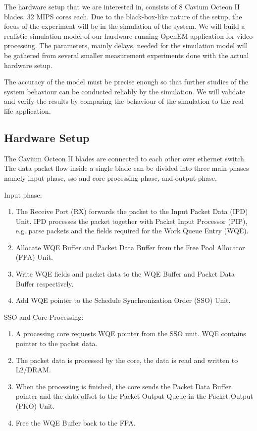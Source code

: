 The hardware setup that we are interested in, consists of 8 Cavium Octeon II blades, 32 MIPS cores each. Due to the black-box-like nature of the setup, the focus of the experiment will be in the simulation of the system. We will build a realistic simulation model of our hardware running OpenEM application for video processing. The parameters, mainly delays, needed for the simulation model will be gathered from several smaller measurement experiments done with the actual hardware setup.

The accuracy of the model must be precise enough so that further studies of the system behaviour can be conducted reliably by the simulation. We will validate and verify the results by comparing the behaviour of the simulation to the real life application.

\subsection{Hardware Setup}
The Cavium Octeon II blades are connected to each other over ethernet switch. The data packet flow inside a single blade can be divided into three main phases namely input phase, sso and core processing phase, and output phase.

Input phase:
\begin{enumerate}
\item The Receive Port (RX) forwards the packet to the Input Packet Data (IPD) Unit. IPD processes the packet together with Packet Input Processor (PIP), e.g. parse packets and the fields required for the Work Queue Entry (WQE).
\item Allocate WQE Buffer and Packet Data Buffer from the Free Pool Allocator (FPA) Unit.
\item Write WQE fields and packet data to the WQE Buffer and Packet Data Buffer respectively.
\item Add WQE pointer to the Schedule Synchronization Order (SSO) Unit.
\end{enumerate}

SSO and Core Processing:
\begin{enumerate}
\item A processing core requests WQE pointer from the SSO unit. WQE contains pointer to the packet data.
\item The packet data is processed by the core, the data is read and written to L2/DRAM.
\item When the processing is finished, the core sends the Packet Data Buffer pointer and the data offset to the Packet Output Queue in the Packet Output (PKO) Unit.
\item Free the WQE Buffer back to the FPA.
\end{enumerate}

